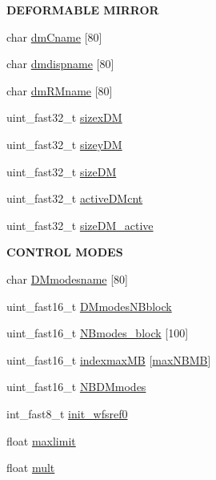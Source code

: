 \begin{Indent}{\bf D\+E\+F\+O\+R\+M\+A\+B\+L\+E M\+I\+R\+R\+O\+R}\par
\begin{DoxyCompactItemize}
\item 
char \hyperlink{structAOLOOPCONTROL__CONF_adf8e165f782a9f9399d72e4b7bea12ea}{dm\+Cname} \mbox{[}80\mbox{]}
\item 
char \hyperlink{structAOLOOPCONTROL__CONF_a7e17905048a9345b17b64d31f64762c6}{dmdispname} \mbox{[}80\mbox{]}
\item 
char \hyperlink{structAOLOOPCONTROL__CONF_a04cb7c0765a5f81114fde04270b6ac2c}{dm\+R\+Mname} \mbox{[}80\mbox{]}
\item 
uint\+\_\+fast32\+\_\+t \hyperlink{structAOLOOPCONTROL__CONF_abb4ef87beb97b115a4e60cec143a3970}{sizex\+D\+M}
\item 
uint\+\_\+fast32\+\_\+t \hyperlink{structAOLOOPCONTROL__CONF_a5a49ee51f3c6841972f27e624854633a}{sizey\+D\+M}
\item 
uint\+\_\+fast32\+\_\+t \hyperlink{structAOLOOPCONTROL__CONF_a360966a766c3b8ba36a017ee662ac7a1}{size\+D\+M}
\item 
uint\+\_\+fast32\+\_\+t \hyperlink{structAOLOOPCONTROL__CONF_a03c39d14c805902e4045617ead77ee9b}{active\+D\+Mcnt}
\item 
uint\+\_\+fast32\+\_\+t \hyperlink{structAOLOOPCONTROL__CONF_ae7159a344aae328c9e56eb6a87ffd898}{size\+D\+M\+\_\+active}
\end{DoxyCompactItemize}
\end{Indent}
\begin{Indent}{\bf C\+O\+N\+T\+R\+O\+L M\+O\+D\+E\+S}\par
\begin{DoxyCompactItemize}
\item 
char \hyperlink{structAOLOOPCONTROL__CONF_a8f0a9886c15fa91d401539205d1ab6b0}{D\+Mmodesname} \mbox{[}80\mbox{]}
\item 
uint\+\_\+fast16\+\_\+t \hyperlink{structAOLOOPCONTROL__CONF_a2fc2d6828a7343b55716cf9cba814606}{D\+Mmodes\+N\+Bblock}
\item 
uint\+\_\+fast16\+\_\+t \hyperlink{structAOLOOPCONTROL__CONF_a48ff0726345a4a682293cf1acddbd568}{N\+Bmodes\+\_\+block} \mbox{[}100\mbox{]}
\item 
uint\+\_\+fast16\+\_\+t \hyperlink{structAOLOOPCONTROL__CONF_a653c264056f8a5a4d3821bcaffaef342}{indexmax\+M\+B} \mbox{[}\hyperlink{AOloopControl_8h_a1607e57c6edf0fe69d995ec9b00b2d2d}{max\+N\+B\+M\+B}\mbox{]}
\item 
uint\+\_\+fast16\+\_\+t \hyperlink{structAOLOOPCONTROL__CONF_aa7647deac3264f4f3b293164b909c203}{N\+B\+D\+Mmodes}
\item 
int\+\_\+fast8\+\_\+t \hyperlink{structAOLOOPCONTROL__CONF_a2c9630b83c5b053ab8335710e5fa8954}{init\+\_\+wfsref0}
\item 
float \hyperlink{structAOLOOPCONTROL__CONF_a471189277591da1769fcb1c11696949b}{maxlimit}
\item 
float \hyperlink{structAOLOOPCONTROL__CONF_afa3e61913c4a9174ab6b44bef3b55777}{mult}
\end{DoxyCompactItemize}
\end{Indent}

